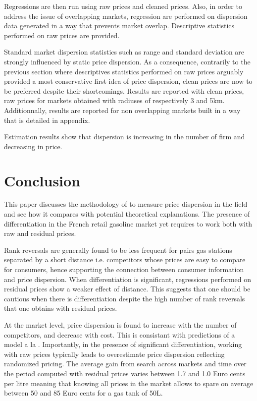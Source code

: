 \documentclass[english]{article}
\begin{document}
{Regressions are then run using raw prices and cleaned prices. Also, in order to address the issue of overlapping markets, regression are performed on dispersion data generated in a way that prevents market overlap. Descriptive statistics performed on raw prices are provided.

Standard market dispersion statistics such as range and standard deviation are strongly influenced by static price dispersion. As a consequence, contrarily to the previous section where descriptives statistics performed on raw prices arguably provided a most conservative first idea of price dispersion, clean prices are now to be preferred despite their shortcomings. Results are reported with clean prices, raw prices for markets obtained with radiuses of respectively 3 and 5km. Additionnally, results are reported for non overlapping markets built in a way that is detailed in appendix.



Estimation results show that dispersion is increasing in the number of firm and decreasing in price.

\section{Conclusion}

This paper discusses the methodology of \cite{TAP11} to measure price dispersion in the field and see how it compares with potential theoretical explanations. The presence of differentiation in the French retail gasoline market yet requires to work both with raw and residual prices.

Rank reversals are generally found to be less frequent for pairs gas stations separated by a short distance i.e. competitors whose prices are easy to compare for consumers, hence supporting the connection between consumer information and price dispersion. When differentiation is significant, regressions performed on residual prices show a weaker effect of distance. This suggests that one should be cautious when there is differentiation despite the high number of rank reversals that one obtains with residual prices.

At the market level, price dispersion is found to increase with the number of competitors, and decrease with cost. This is consistant with predictions of a model a la \cite{VAR80}. Importantly, in the presence of significant differentiation, working with raw prices typically leads to overestimate price dispersion reflecting randomized pricing. The average gain from search across markets and time over the period computed with residual prices varies between 1.7 and 1.0 Euro cents per litre meaning that knowing all prices in the market allows to spare on average between 50 and 85 Euro cents for a gas tank of 50L.

}
\end{document}

